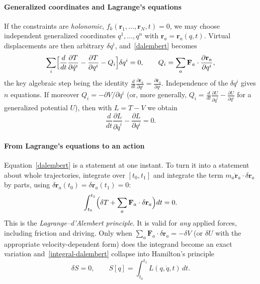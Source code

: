 \paragraph{Generalized coordinates and Lagrange's equations}

If the constraints are \emph{holonomic}, $f_k(\mathbf r_1,\dots,\mathbf r_N,t)=0$,
we may choose independent generalized coordinates $q^1,\dots,q^n$ with
$\mathbf r_a=\mathbf r_a(q,t)$. Virtual displacements are then arbitrary
$\delta q^i$, and~\eqref{dalembert} becomes
\begin{equation}
  \sum_i\Bigl[\frac{d}{dt}\frac{\partial T}{\partial\dot q^i}
  -\frac{\partial T}{\partial q^i}-Q_i\Bigr]\delta q^i=0,
  \qquad Q_i=\sum_a\mathbf F_a\cdot\frac{\partial\mathbf r_a}{\partial q^i},
  \label{lagrange-T}
\end{equation}
the key algebraic step being the identity
$\frac{d}{dt}\frac{\partial\mathbf r_a}{\partial q^i}
=\frac{\partial\dot{\mathbf r}_a}{\partial q^i}$. Independence of the
$\delta q^i$ gives $n$ equations. If moreover $Q_i=-\partial V/\partial q^i$
(or, more generally, $Q_i=\frac{d}{dt}\frac{\partial U}{\partial\dot q^i}
-\frac{\partial U}{\partial q^i}$ for a generalized potential $U$), then with
$L=T-V$ we obtain
\begin{equation}
  \frac{d}{dt}\frac{\partial L}{\partial\dot q^i}-\frac{\partial L}{\partial q^i}=0 .
  \label{EL}
\end{equation}

\paragraph{From Lagrange's equations to an action}

Equation~\eqref{dalembert} is a statement at one instant. To turn it into
a statement about whole trajectories, integrate over $[t_0,t_1]$ and integrate
the term $m_a\ddot{\mathbf r}_a\cdot\delta\mathbf r_a$ by parts, using
$\delta\mathbf r_a(t_0)=\delta\mathbf r_a(t_1)=0$:
\begin{equation}
  \int_{t_0}^{t_1}\Bigl(\delta T+\sum_a\mathbf F_a\cdot\delta\mathbf r_a\Bigr)dt=0 .
  \label{integral-dalembert}
\end{equation}
This is the \emph{Lagrange--d'Alembert principle}. It is valid for \emph{any}
applied forces, including friction and driving. Only when
$\sum_a\mathbf F_a\cdot\delta\mathbf r_a=-\delta V$ (or $\delta U$ with the
appropriate velocity-dependent form) does the integrand become an exact
variation and~\eqref{integral-dalembert} collapse into Hamilton's principle
\begin{equation}
  \delta S=0,\qquad S[q]=\int_{t_0}^{t_1}L(q,\dot q,t)\,dt .
  \label{hamilton}
\end{equation}

